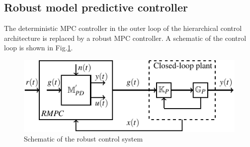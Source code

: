 \documentclass[letterpaper, 10 pt, conference]{ieeeconf}  %
\begin{document}
	\subsection{Robust model predictive controller}
	The deterministic MPC controller in the outer loop of the hierarchical control architecture is replaced by a robust MPC controller. A schematic of the control loop is shown in Fig.\ref{fullloop}. 
	\begin{figure}[h]
		\vspace{-3pt}
		\hspace{20pt}
		\includegraphics[scale = 0.9]{final_robust.pdf}
		\caption{Schematic of the robust control system}
		\label{fullloop}
	\end{figure} 
	
\end{document}
